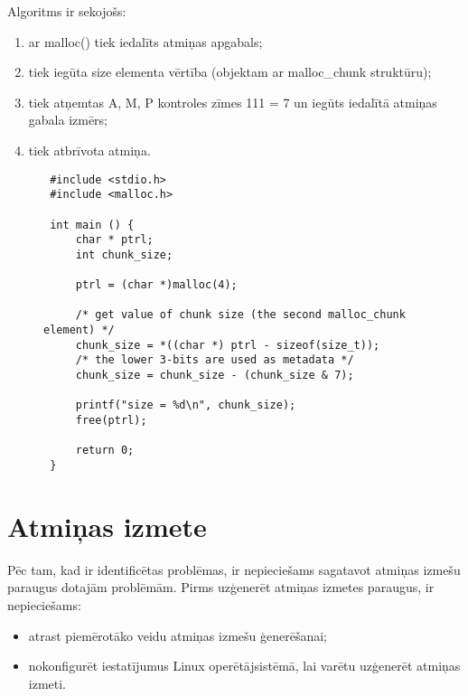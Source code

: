 Algoritms ir sekojošs: 
\begin{enumerate}
\item ar malloc() tiek iedalīts atmiņas apgabals;
\item  tiek iegūta size elementa vērtība (objektam ar malloc\_chunk struktūru);
\item  tiek atņemtas A, M, P kontroles zīmes 111 = 7 un iegūts iedalītā atmiņas  gabala izmērs;
\item  tiek atbrīvota atmiņa.
\end{enumerate}

\begin{figure}[h]
\begin{lstlisting}
 #include <stdio.h>
 #include <malloc.h>

 int main () {
     char * ptrl;
     int chunk_size;

     ptrl = (char *)malloc(4);
 
     /* get value of chunk size (the second malloc_chunk element) */
     chunk_size = *((char *) ptrl - sizeof(size_t));
     /* the lower 3-bits are used as metadata */
     chunk_size = chunk_size - (chunk_size & 7);
 
     printf("size = %d\n", chunk_size);
     free(ptrl);
 
     return 0;
 }
\end{lstlisting}
\caption{\textbf{\fontsize{11}{12}\selectfont {Izmēra noteikšana iedalītām gabalam}}}
\end{figure}




\section{Atmiņas izmete}

Pēc tam, kad ir identificētas problēmas, ir nepieciešams sagatavot atmiņas izmešu paraugus dotajām problēmām.
Pirms uzģenerēt atmiņas izmetes paraugus, ir nepieciešams:
\begin{itemize}
    \item   atrast piemērotāko veidu atmiņas izmešu ģenerēšanai;
    \item   nokonfigurēt iestatījumus Linux operētājsistēmā, lai varētu uzģenerēt atmiņas izmeti.
\end{itemize} 

